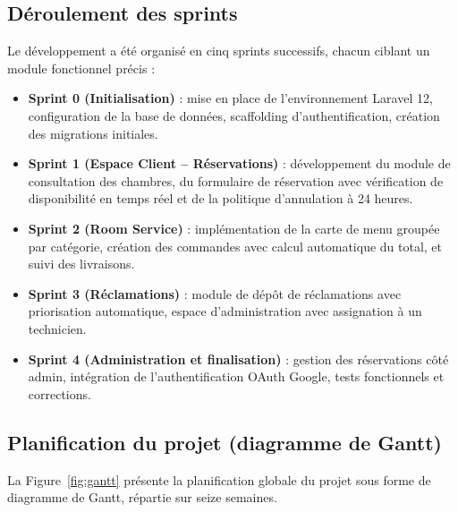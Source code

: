 \documentclass[12pt,a4paper]{report}
\begin{document}
\subsection{Déroulement des sprints}

Le développement a été organisé en cinq sprints successifs, chacun ciblant
un module fonctionnel précis :

\begin{itemize}
    \item \textbf{Sprint 0 (Initialisation)} : mise en place de
    l'environnement Laravel 12, configuration de la base de données,
    scaffolding d'authentification, création des migrations initiales.
    \item \textbf{Sprint 1 (Espace Client -- Réservations)} : développement
    du module de consultation des chambres, du formulaire de réservation
    avec vérification de disponibilité en temps réel et de la politique
    d'annulation à 24 heures.
    \item \textbf{Sprint 2 (Room Service)} : implémentation de la carte de
    menu groupée par catégorie, création des commandes avec calcul
    automatique du total, et suivi des livraisons.
    \item \textbf{Sprint 3 (Réclamations)} : module de dépôt de
    réclamations avec priorisation automatique, espace d'administration
    avec assignation à un technicien.
    \item \textbf{Sprint 4 (Administration et finalisation)} : gestion des
    réservations côté admin, intégration de l'authentification OAuth
    Google, tests fonctionnels et corrections.
\end{itemize}

\subsection{Planification du projet (diagramme de Gantt)}

La Figure~\ref{fig:gantt} présente la planification globale du projet sous
forme de diagramme de Gantt, répartie sur seize semaines.
\end{document}
